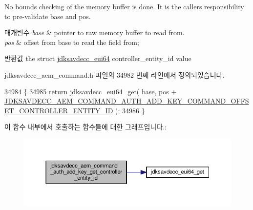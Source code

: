 No bounds checking of the memory buffer is done. It is the caller\textquotesingle{}s responsibility to pre-\/validate base and pos.


\begin{DoxyParams}{매개변수}
{\em base} & pointer to raw memory buffer to read from. \\
\hline
{\em pos} & offset from base to read the field from; \\
\hline
\end{DoxyParams}
\begin{DoxyReturn}{반환값}
the struct \hyperlink{structjdksavdecc__eui64}{jdksavdecc\+\_\+eui64} controller\+\_\+entity\+\_\+id value 
\end{DoxyReturn}


jdksavdecc\+\_\+aem\+\_\+command.\+h 파일의 34982 번째 라인에서 정의되었습니다.


\begin{DoxyCode}
34984 \{
34985     \textcolor{keywordflow}{return} \hyperlink{group__eui64_ga2652311a25a6b91cddbed75c108c7031}{jdksavdecc\_eui64\_get}( base, pos + 
      \hyperlink{group__command__auth__add__key_gab2555626b6b26b238906f0bdce78faa5}{JDKSAVDECC\_AEM\_COMMAND\_AUTH\_ADD\_KEY\_COMMAND\_OFFSET\_CONTROLLER\_ENTITY\_ID}
       );
34986 \}
\end{DoxyCode}


이 함수 내부에서 호출하는 함수들에 대한 그래프입니다.\+:
\nopagebreak
\begin{figure}[H]
\begin{center}
\leavevmode
\includegraphics[width=350pt]{group__command__auth__add__key_gab5910142f38f2ec6a213bfddf37c4075_cgraph}
\end{center}
\end{figure}


